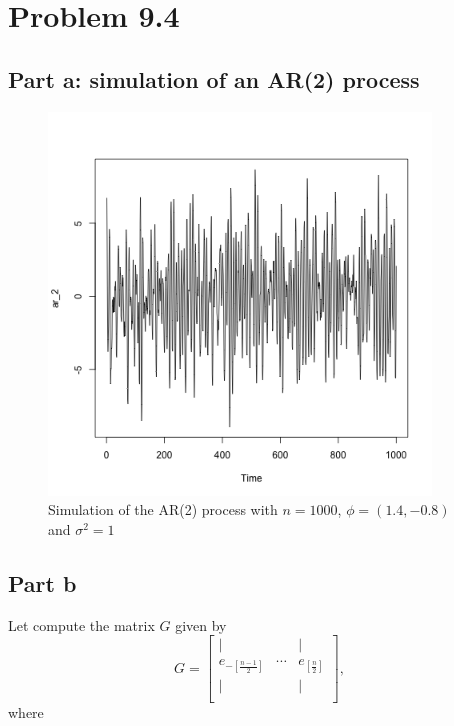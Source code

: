 \documentclass[11pt, oneside]{article}   	%
\begin{document}
\section{Problem 9.4}
\subsection{Part a: simulation of an AR(2) process}
\begin{figure}[H] %
   \centering
   \includegraphics[width=4in]{p94ar2} 
   \caption{Simulation of the AR(2) process with $n=1000$, $\phi=(1.4, -0.8)$ and $\sigma^{2}=1$}
   \label{fig:example}
\end{figure}


\subsection{Part b}
Let compute the matrix $G$ given by 
\begin{equation}
G = 
\begin{bmatrix}
    | & & | \\
    e_{-\left[ \frac{n-1}{2}\right]}&\cdots & e_{\left[ \frac{n}{2}\right]}\\
     | & & |\\
\end{bmatrix},
\end{equation}
where 
\end{document}
